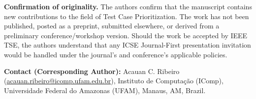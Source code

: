 \documentclass[11pt]{article}
\begin{document}
\medskip
\noindent\textbf{Confirmation of originality.} The authors confirm that the
manuscript contains new contributions to the field of Test Case Prioritization.
The work has not been published, posted as a preprint, submitted elsewhere, or
derived from a preliminary conference/workshop version. Should the work be
accepted by IEEE TSE, the authors understand that any ICSE Journal-First
presentation invitation would be handled under the journal's and conference's
applicable policies.

\medskip
\noindent\textbf{Contact (Corresponding Author):} Acauan C. Ribeiro
(\href{mailto:acauan.ribeiro@icomp.ufam.edu.br}{acauan.ribeiro@icomp.ufam.edu.br}),
Instituto de Computação (IComp), Universidade Federal do Amazonas (UFAM),
Manaus, AM, Brazil.
\end{document}
